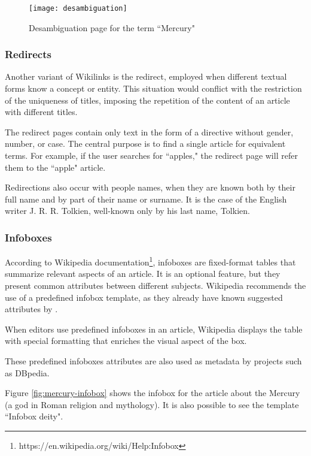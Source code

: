 \begin{figure}[!h]
\centering
  \texttt{[image: desambiguation]}
  \caption{Desambiguation page for the term ``Mercury"}
  \label{fig:mercury-desambiguation}
\end{figure}


\subsubsection{\hspace*{3pt} Redirects}

Another variant of Wikilinks is the redirect, employed when different textual forms know a concept or entity. This situation would conflict with the restriction of the uniqueness of titles, imposing the repetition of the content of an article with different titles. 

The redirect pages contain only text in the form of a directive without gender, number, or case. The central purpose is to find a single article for equivalent terms. For example, if the user searches for ``apples," the redirect page will refer them to the ``apple" article. 

Redirections also occur with people names, when they are known both by their full name and by part of their name or surname. It is the case of the English writer  J. R. R. Tolkien, well-known only by his last name, Tolkien.

\subsubsection{\hspace*{3pt} Infoboxes}

According to Wikipedia documentation\footnote{https://en.wikipedia.org/wiki/Help:Infobox}, infoboxes are fixed-format tables that summarize relevant aspects of an article. It is an optional feature, but they present common attributes between different subjects. Wikipedia recommends the use of a predefined infobox template, as they already have known suggested attributes by 
. 

When editors use predefined infoboxes in an article, Wikipedia displays the table with special formatting that enriches the visual aspect of the box. 

These predefined infoboxes attributes are also used as metadata by projects such as DBpedia. 

Figure \ref{fig:mercury-infobox} shows the infobox for the article about the Mercury (a god in Roman religion and mythology). It is also possible to see the template ``Infobox deity". 



